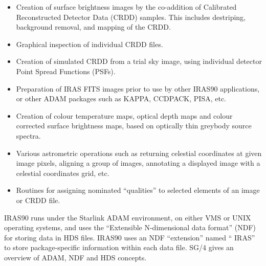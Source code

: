 \begin{itemize}

\item Creation of surface brightness images by the co-addition of Calibrated
Reconstructed Detector Data ({\small CRDD}) samples. This includes destriping,
background removal, and mapping of the {\small CRDD}.

\item Graphical inspection of individual {\small CRDD} files.

\item Creation of simulated {\small CRDD} from a trial sky image, using individual
detector Point Spread Functions (PSFs).

\item Preparation of {\small IRAS} {\small FITS} images prior to use by other
{\small IRAS90} applications, or other {\small ADAM} packages such as {\small
KAPPA, CCDPACK, PISA,} etc.

\item Creation of colour temperature maps, optical depth maps and colour
corrected surface brightness maps, based on optically thin greybody source
spectra.

\item Various astrometric operations such as returning celestial coordinates
at given image pixels, aligning a group of images, annotating a displayed
image with a celestial coordinates grid, etc.

\item Routines for assigning nominated ``qualities'' to selected elements of an
image or {\small CRDD} file.

\end{itemize}

{\small IRAS90} runs under the Starlink {\small ADAM} environment, on either
{\small VMS} or {\small UNIX} operating systems, and uses the ``Extensible
N-dimensional data format'' ({\small NDF}) for storing data in {\small HDS}
files. {\small IRAS90} uses an {\small NDF} ``extension'' named ``{\small
IRAS}'' to store package-specific information within each data file. SG/4 gives
an overview of {\small ADAM}, {\small NDF} and {\small HDS} concepts.

